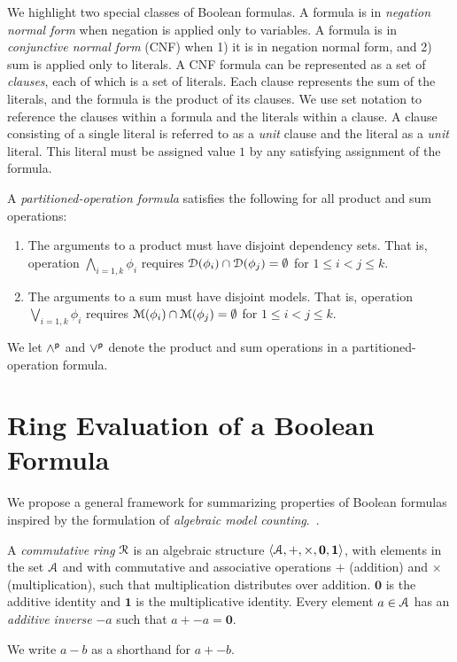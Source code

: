 \documentclass[letterpaper,USenglish,cleveref, autoref, thm-restate]{lipics-v2021}
\newcommand{\pand}{\mathbin{\land^{\sf p}}}
\newcommand{\por}{\mathbin{\lor^{\sf p}}}
\newcommand{\dependencyset}{{\cal D}}
\newcommand{\ring}{{\cal R}}
\newcommand{\dset}{{\cal A}}
\newcommand{\radd}{+}
\newcommand{\rmul}{\times}
\newcommand{\addident}{\textbf{0}}
\newcommand{\mulident}{\textbf{1}}
\newcommand{\modelset}{{\cal M}}
\begin{document}
  We highlight two special classes of Boolean formulas.  A formula is
  in {\em negation normal form} when negation is applied only to variables.  A
  formula is in {\em conjunctive normal form} (CNF) when 1) it is in
  negation normal form, and 2) sum is applied only to literals.  A CNF
  formula can be represented as a set of {\em clauses}, each of which is a
  set of literals.  Each clause represents the sum of the
  literals, and the formula is the product of its clauses.  We use
  set notation to reference the clauses within a formula and the
  literals within a clause.  A clause consisting of a single literal is referred to as a {\em unit} clause and the literal as a {\em unit} literal.
This literal must be assigned value $1$ by any satisfying assignment of the formula.

  A {\em partitioned-operation formula}
 satisfies the following for all product and sum operations:
      \begin{enumerate}
      \item The arguments to a product must have disjoint dependency sets.  That is, operation
        $\bigwedge_{i=1,k} \phi_i$ requires $\dependencyset(\phi_i) \cap \dependencyset(\phi_j) = \emptyset$ for $1 \leq i < j \leq k$.
      \item The arguments to a sum must have disjoint models.  That is, operation
        $\bigvee_{i=1,k} \phi_i$ requires $\modelset(\phi_i) \cap \modelset(\phi_j) = \emptyset$ for $1 \leq i < j \leq k$.
      \end{enumerate}
     We let $\pand$ and $\por$ denote the product and sum operations in a partitioned-operation formula.

  \section{Ring Evaluation of a Boolean Formula}

We propose a general framework for summarizing properties of Boolean
formulas inspired by the formulation of {\em algebraic model counting}.~\cite{kimmig:jal:2017}.

\begin{definition}
  A {\em commutative ring} $\ring$ is an algebraic structure
  $\langle \dset, \radd, \rmul, \addident, \mulident \rangle$,
  with elements in the set $\dset$ and with commutative and
  associative operations $\radd$ (addition) and $\rmul$ (multiplication),
  such that multiplication distributes
  over addition.  $\addident$ is the additive identity and $\mulident$ is
  the multiplicative identity.  Every element $a \in \dset$ has an
  {\em additive inverse} $-a$ such that $a + -a = \addident$.
\label{def:ring}
\end{definition}
We write $a - b$ as a shorthand for $a + -b$.
\end{document}
